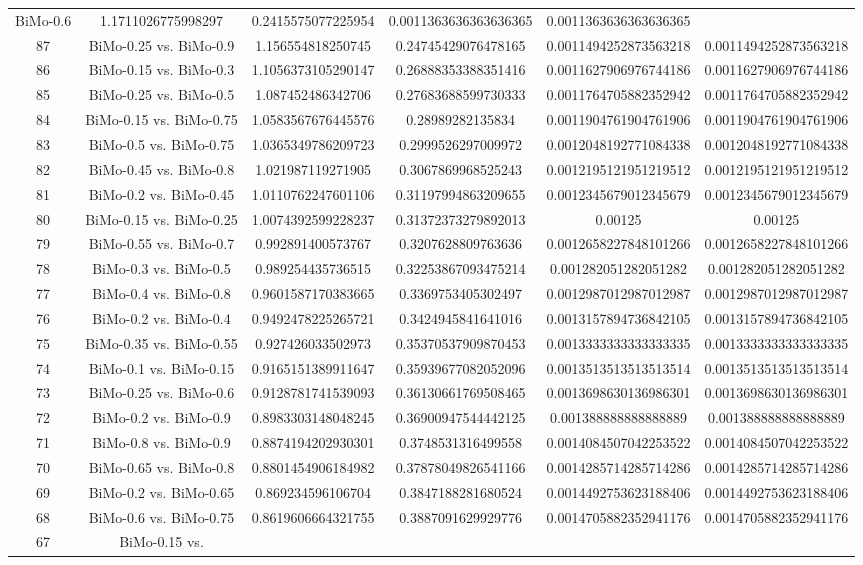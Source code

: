 \documentclass[a4paper,10pt]{article}
\begin{document}
\begin{landscape}
\begin{table}[!htp]
\begin{tabular}{cccccc}
BiMo-0.6&1.1711026775998297&0.2415575077225954&0.0011363636363636365&0.0011363636363636365\\87&BiMo-0.25 vs. BiMo-0.9&1.156554818250745&0.24745429076478165&0.0011494252873563218&0.0011494252873563218\\86&BiMo-0.15 vs. BiMo-0.3&1.1056373105290147&0.26888353388351416&0.0011627906976744186&0.0011627906976744186\\85&BiMo-0.25 vs. BiMo-0.5&1.087452486342706&0.27683688599730333&0.0011764705882352942&0.0011764705882352942\\84&BiMo-0.15 vs. BiMo-0.75&1.0583567676445576&0.28989282135834&0.0011904761904761906&0.0011904761904761906\\83&BiMo-0.5 vs. BiMo-0.75&1.0365349786209723&0.2999526297009972&0.0012048192771084338&0.0012048192771084338\\82&BiMo-0.45 vs. BiMo-0.8&1.021987119271905&0.3067869968525243&0.0012195121951219512&0.0012195121951219512\\81&BiMo-0.2 vs. BiMo-0.45&1.0110762247601106&0.31197994863209655&0.0012345679012345679&0.0012345679012345679\\80&BiMo-0.15 vs. BiMo-0.25&1.0074392599228237&0.31372373279892013&0.00125&0.00125\\79&BiMo-0.55 vs. BiMo-0.7&0.992891400573767&0.3207628809763636&0.0012658227848101266&0.0012658227848101266\\78&BiMo-0.3 vs. BiMo-0.5&0.989254435736515&0.32253867093475214&0.001282051282051282&0.001282051282051282\\77&BiMo-0.4 vs. BiMo-0.8&0.9601587170383665&0.3369753405302497&0.0012987012987012987&0.0012987012987012987\\76&BiMo-0.2 vs. BiMo-0.4&0.9492478225265721&0.3424945841641016&0.0013157894736842105&0.0013157894736842105\\75&BiMo-0.35 vs. BiMo-0.55&0.927426033502973&0.35370537909870453&0.0013333333333333335&0.0013333333333333335\\74&BiMo-0.1 vs. BiMo-0.15&0.9165151389911647&0.35939677082052096&0.0013513513513513514&0.0013513513513513514\\73&BiMo-0.25 vs. BiMo-0.6&0.9128781741539093&0.36130661769508465&0.0013698630136986301&0.0013698630136986301\\72&BiMo-0.2 vs. BiMo-0.9&0.8983303148048245&0.36900947544442125&0.001388888888888889&0.001388888888888889\\71&BiMo-0.8 vs. BiMo-0.9&0.8874194202930301&0.3748531316499558&0.0014084507042253522&0.0014084507042253522\\70&BiMo-0.65 vs. BiMo-0.8&0.8801454906184982&0.37878049826541166&0.0014285714285714286&0.0014285714285714286\\69&BiMo-0.2 vs. BiMo-0.65&0.869234596106704&0.3847188281680524&0.0014492753623188406&0.0014492753623188406\\68&BiMo-0.6 vs. BiMo-0.75&0.8619606664321755&0.3887091629929776&0.0014705882352941176&0.0014705882352941176\\67&BiMo-0.15 vs. 
\end{tabular}
\end{table}
\end{landscape}
\end{document}
